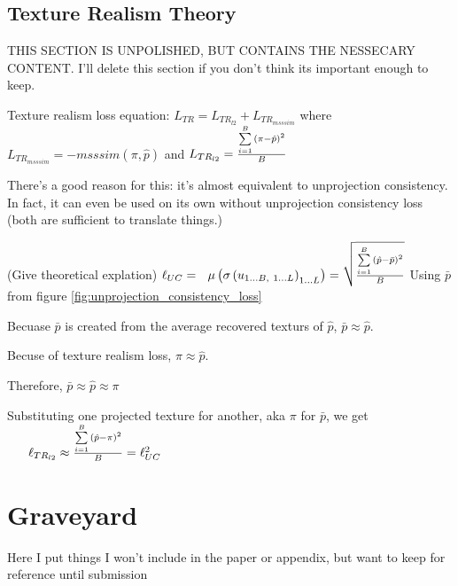 \documentclass{article}
\begin{document}
	\subsection*{Texture Realism Theory}
		\label{sec:texture_realism_theory}


		THIS SECTION IS UNPOLISHED, BUT CONTAINS  THE NESSECARY CONTENT.
		I'll delete this section if you don't think its important enough to keep.

		Texture realism loss equation:
		$L_{TR}=L_{TR_{l2}}+L_{TR_{msssim}}$
		where 
		$L_{TR_{msssim}} = -msssim(\pi,\hat{p})$ and
		$L_{TR_{l2}} = \frac{
			\sum\limits_{i=1}^B {
			\left( \pi-\hat{p}  \right)^2
				} 
		}
		{B}$

		There's a good reason for this: it's almost equivalent to unprojection consistency.
		In fact, it can even be used on its own without unprojection consistency loss (both are sufficient to translate things.)

		(Give theoretical explation)
		$
		\ell_{UC} = 
		\
		\
		\mu\left(\sigma\left(u_{1\dots B,\ 1\dots L}\right)_{1 \dots L}\right) = 
		\sqrt{
		\frac{
			\sum\limits_{i=1}^B {
				\left( \hat{p}-\bar{p}  \right)^2
				} 
			}
			{B}
		}
		$
		Using $\bar{p}$ from figure \ref{fig:unprojection_consistency_loss}

		Becuase $\bar{p}$ is created from the average recovered texturs of $\hat{p}$, $\bar{p} \approx \hat{p}$.

		Becuse of texture realism loss, $\pi \approx \hat{p}$.

		Therefore, $\bar{p} \approx \hat{p} \approx \pi$



		Substituting one projected texture for another, aka $\pi$ for $\bar{p}$, we get 
		$ \
		\
		\
		\
		\ \ell_{TR_{l2}}
		\approx
		\frac{\sum\limits_{i=1}^B {
			\left( \hat{p}-\pi  \right)^2
			}}{B} = \ell_{UC}^2
		$


\section*{Graveyard}

Here I put things I won't include in the paper or appendix, but want to keep for reference until submission
\end{document}
